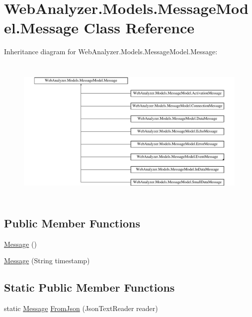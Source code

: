 \hypertarget{class_web_analyzer_1_1_models_1_1_message_model_1_1_message}{}\section{Web\+Analyzer.\+Models.\+Message\+Model.\+Message Class Reference}
\label{class_web_analyzer_1_1_models_1_1_message_model_1_1_message}
Inheritance diagram for Web\+Analyzer.\+Models.\+Message\+Model.\+Message\+:\begin{figure}[H]
\begin{center}
\leavevmode
\includegraphics[height=7.200000cm]{class_web_analyzer_1_1_models_1_1_message_model_1_1_message}
\end{center}
\end{figure}
\subsection*{Public Member Functions}
\begin{DoxyCompactItemize}
\item 
\hyperlink{class_web_analyzer_1_1_models_1_1_message_model_1_1_message_ad1fc3e795c7af522dbf12792f621abfd}{Message} ()
\item 
\hyperlink{class_web_analyzer_1_1_models_1_1_message_model_1_1_message_af05222ad929359946a4ce5d983bf7b22}{Message} (String timestamp)
\end{DoxyCompactItemize}
\subsection*{Static Public Member Functions}
\begin{DoxyCompactItemize}
\item 
static \hyperlink{class_web_analyzer_1_1_models_1_1_message_model_1_1_message}{Message} \hyperlink{class_web_analyzer_1_1_models_1_1_message_model_1_1_message_addad192b40719813b8b260cbea4b6a39}{From\+Json} (Json\+Text\+Reader reader)
\end{DoxyCompactItemize}
